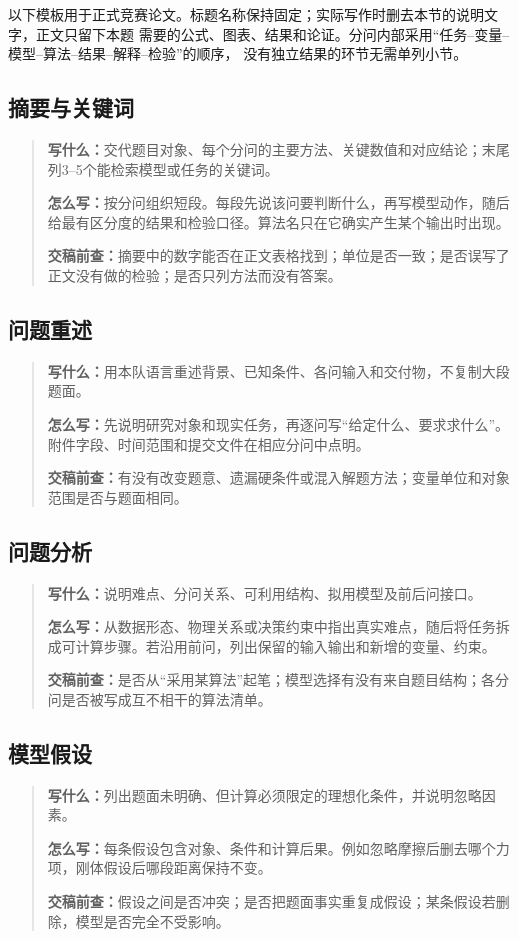 \documentclass[UTF8,zihao=-4]{ctexart}
\newenvironment{writeguide}
  {\begin{quote}\small\color{black}}
  {\end{quote}}
\newcommand{\guideitem}[2]{%
  \par\noindent\textbf{\color{inkblue}#1：}\ignorespaces #2\par
}
\begin{document}
以下模板用于正式竞赛论文。标题名称保持固定；实际写作时删去本节的说明文字，正文只留下本题
需要的公式、图表、结果和论证。分问内部采用“任务--变量--模型--算法--结果--解释--检验”的顺序，
没有独立结果的环节无需单列小节。

\subsection{摘要与关键词}
\begin{writeguide}
\guideitem{写什么}{交代题目对象、每个分问的主要方法、关键数值和对应结论；末尾列3--5个能检索模型或任务的关键词。}
\guideitem{怎么写}{按分问组织短段。每段先说该问要判断什么，再写模型动作，随后给最有区分度的结果和检验口径。算法名只在它确实产生某个输出时出现。}
\guideitem{交稿前查}{摘要中的数字能否在正文表格找到；单位是否一致；是否误写了正文没有做的检验；是否只列方法而没有答案。}
\end{writeguide}

\subsection{问题重述}
\begin{writeguide}
\guideitem{写什么}{用本队语言重述背景、已知条件、各问输入和交付物，不复制大段题面。}
\guideitem{怎么写}{先说明研究对象和现实任务，再逐问写“给定什么、要求求什么”。附件字段、时间范围和提交文件在相应分问中点明。}
\guideitem{交稿前查}{有没有改变题意、遗漏硬条件或混入解题方法；变量单位和对象范围是否与题面相同。}
\end{writeguide}

\subsection{问题分析}
\begin{writeguide}
\guideitem{写什么}{说明难点、分问关系、可利用结构、拟用模型及前后问接口。}
\guideitem{怎么写}{从数据形态、物理关系或决策约束中指出真实难点，随后将任务拆成可计算步骤。若沿用前问，列出保留的输入输出和新增的变量、约束。}
\guideitem{交稿前查}{是否从“采用某算法”起笔；模型选择有没有来自题目结构；各分问是否被写成互不相干的算法清单。}
\end{writeguide}

\subsection{模型假设}
\begin{writeguide}
\guideitem{写什么}{列出题面未明确、但计算必须限定的理想化条件，并说明忽略因素。}
\guideitem{怎么写}{每条假设包含对象、条件和计算后果。例如忽略摩擦后删去哪个力项，刚体假设后哪段距离保持不变。}
\guideitem{交稿前查}{假设之间是否冲突；是否把题面事实重复成假设；某条假设若删除，模型是否完全不受影响。}
\end{writeguide}
\end{document}
